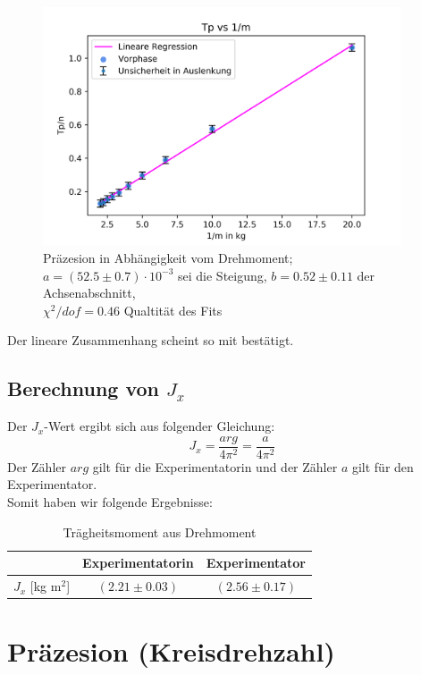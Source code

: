\documentclass[bibliography=totocnumbered]{scrartcl}
\begin{document}
\newpage
\begin{figure}[!ht]
	\centering								 
	\includegraphics[width=300pt]{fotos/gpr1/M10_A1_S.png}
	\caption[Präzesion in Abhängigkeit vom Drehmoment]{Präzesion in Abhängigkeit vom Drehmoment; $ a=(52.5\pm0.7)\cdot10^{-3} $ sei die Steigung, $ b=0.52\pm0.11 $ der Achsenabschnitt, \\$ \chi^{2}/dof=0.46 $ Qualtität des Fits}							 
	\label{Abb: A1 Sara}							 
\end{figure}


	
	Der lineare Zusammenhang scheint so mit bestätigt.
	
	\subsection{Berechnung von $ J_{x} $}
	Der $ J_{x} $-Wert ergibt sich aus folgender Gleichung:
	\begin{equation}\label{eq: Jx aus Drehmoment}
		J_{x}=\dfrac{arg}{4\pi ^{2}}=\dfrac{a}{4\pi ^{2}}
	\end{equation}
Der Zähler $ arg $ gilt für die Experimentatorin und der Zähler $ a $ gilt für den Experimentator.\\
	Somit haben wir folgende Ergebnisse:
	\begin{table}[ht!]
		\centering
		\caption{Trägheitsmoment aus Drehmoment}
		\begin{tabular}{|c|c|c|}
			\hline
			& Experimentatorin & Experimentator \\
			\hline
			$ J_{x} $ [kg m$ ^{2} $]& $ ( 2.21\pm0.03  ) $ & $ (2.56\pm 0.17) $ \\
			\hline
		\end{tabular}
	\label{tab: Jx aus Kreisdrehzahl}
	\end{table}
	
	\newpage
	\section{Präzesion (Kreisdrehzahl)}
	
\end{document}
